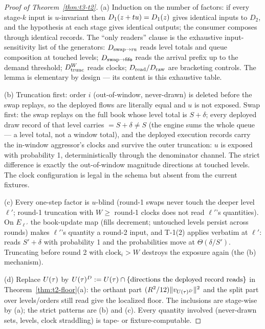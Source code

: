 \begin{proof}[Proof of Theorem~\ref{thm:t3-t2}]
(a) Induction on the number of factors: if every stage-$k$ input is
$u$-invariant then $D_1(\rawflow + tu) = D_1(\rawflow)$ gives identical
inputs to $D_2$, and the hypothesis at each stage gives identical outputs;
the consumer composes through identical records. The ``only readers''
clause is the exhaustive input-sensitivity list of the generators:
$\Dswapru$ reads level totals and queue composition at touched levels;
$\Dswapfifo$ reads the arrival prefix up to the demand threshold;
$\Dtrunc[W]$ reads clocks; $\Dread/\Draw$ are bracketing controls. The
lemma is elementary by design --- its content is this exhaustive table.

(b) Truncation first: order $i$ (out-of-window, never-drawn) is deleted
before the swap replays, so the deployed flows are literally equal and $u$
is not exposed. Swap first: the swap replays on the full book whose level
total is $S + \delta$; every deployed draw record of that level carries
 $= S + \delta \ne S$ (the engine sums the whole queue
--- a level total, not a window total), and the deployed execution records
carry the in-window aggressor's clocks and survive the outer truncation:
$u$ is exposed with probability 1, deterministically through the
denominator channel. The strict difference is exactly the out-of-window
magnitude directions at touched levels. The clock configuration is legal in
the schema but absent from the current fixtures.

(c) Every one-step factor is $u$-blind (round-1 swaps never touch the
deeper level $\ell'$; round-1 truncation with $W \ge$ round-1 clocks does
not read $\ell'$'s quantities). On $E_{\ell'}$ the book-update map (fills
decrement; untouched levels persist across rounds) makes $\ell'$'s quantity
a round-2 input, and T-1(2) applies verbatim at $\ell'$:
 reads $S' + \delta$ with probability 1 and the
probabilities move at $\Theta(\delta/S')$. Truncating before round 2 with
$\mathrm{clock}_i > W$ destroys the exposure again (the (b) mechanism).

(d) Replace $\Utau$ by
$\Utau^{D} := \Utau \cap \{\text{directions the deployed record reads}\}$ in
Theorem~\ref{thm:t2-floor}(a): the orthant part $(R^2/12)\|v_{\Utau^{D}}\|^2$
and the split part over levels/orders still read give the localized floor.
The inclusions are stage-wise by (a); the strict patterns are (b) and (c).
Every quantity involved (never-drawn sets,  levels,
clock straddling) is tape- or fixture-computable.
\end{proof}

